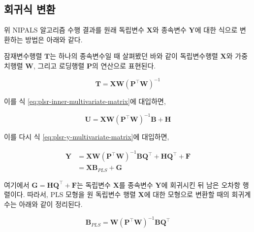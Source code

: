 \documentclass[]{book}
\newenvironment{Shaded}{\begin{snugshade}}{\end{snugshade}}
\newcommand{\KeywordTok}[1]{\textcolor[rgb]{0.13,0.29,0.53}{\textbf{#1}}}
\newcommand{\NormalTok}[1]{#1}
\newcommand{\OperatorTok}[1]{\textcolor[rgb]{0.81,0.36,0.00}{\textbf{#1}}}
\newcommand{\StringTok}[1]{\textcolor[rgb]{0.31,0.60,0.02}{#1}}
\begin{document}
\hypertarget{plsr-multivariate-transform}{%
\subsection{회귀식 변환}\label{plsr-multivariate-transform}}

위 NIPALS 알고리즘 수행 결과를 원래 독립변수 \(\mathbf{X}\)와 종속변수 \(\mathbf{Y}\)에 대한 식으로 변환하는 방법은 아래와 같다.

잠재변수행렬 \(\mathbf{T}\)는 하나의 종속변수일 때 살펴봤던 바와 같이 독립변수행렬 \(\mathbf{X}\)와 가중치행렬 \(\mathbf{W}\), 그리고 로딩행렬 \(\mathbf{P}\)의 연산으로 표현된다.

\begin{equation}
\mathbf{T} = \mathbf{X} \mathbf{W} \left(\mathbf{P}^\top \mathbf{W}\right)^{-1}
\end{equation}

이를 식 \eqref{eq:plsr-inner-multivariate-matrix}에 대입하면,

\begin{equation}
\mathbf{U} = \mathbf{X} \mathbf{W} \left(\mathbf{P}^\top \mathbf{W}\right)^{-1} \mathbf{B} + \mathbf{H}
\end{equation}

이를 다시 식 \eqref{eq:plsr-y-multivariate-matrix}에 대입하면,

\begin{equation}
\begin{split}
\mathbf{Y} &= \mathbf{X} \mathbf{W} \left(\mathbf{P}^\top \mathbf{W}\right)^{-1} \mathbf{B} \mathbf{Q}^\top + \mathbf{H} \mathbf{Q}^\top + \mathbf{F}\\
&= \mathbf{X} \mathbf{B}_{PLS} + \mathbf{G}
\end{split} \label{eq:plsr-multivariate-beta}
\end{equation}

여기에서 \(\mathbf{G} = \mathbf{H} \mathbf{Q}^\top + \mathbf{F}\)는 독립변수 \(\mathbf{X}\)를 종속변수 \(\mathbf{Y}\)에 회귀시킨 뒤 남은 오차항 행렬이다. 따라서, PLS 모형을 원 독립변수 행렬 \(\mathbf{X}\)에 대한 모형으로 변환할 때의 회귀계수는 아래와 같이 정리된다.

\begin{equation}
\mathbf{B}_{PLS} = \mathbf{W} \left(\mathbf{P}^\top \mathbf{W}\right)^{-1} \mathbf{B} \mathbf{Q}^\top
\end{equation}

\begin{Shaded}
\end{Shaded}
\end{document}
